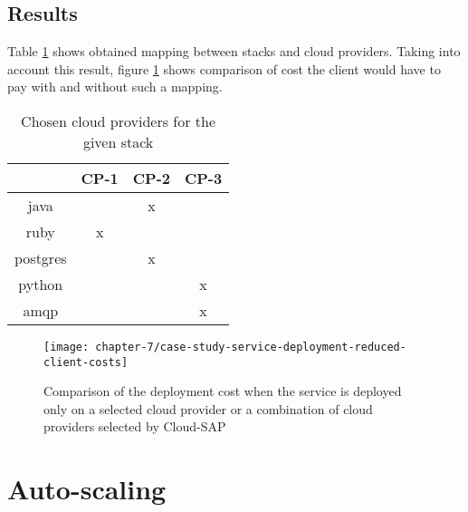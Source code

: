 \subsection{Results}
Table \ref{tbl:test-service-deployment-cost-mapping} shows obtained mapping between stacks and cloud providers. Taking into account this result, figure \ref{ch7:service-deployment-cost} shows comparison of cost the client would have to pay with and without such a mapping.

\begin{table}
  \centering
  \begin{tabular}{ | c | c | c | c | }
    \hline                        
    & CP-1 & CP-2 & CP-3 \\
    \hline
    java      & & x & \\
    ruby      & x & & \\
    postgres  & & x & \\
    python    & & & x \\
    amqp      & & & x \\
    \hline  
  \end{tabular}
  \caption{Chosen cloud providers for the given stack}
  \label{tbl:test-service-deployment-cost-mapping}
\end{table}

\begin{figure}[!ht]
  \begin{center}
    \texttt{[image: chapter-7/case-study-service-deployment-reduced-client-costs]}
  \end{center}
  \caption{Comparison of the deployment cost when the service is deployed only on a selected cloud provider or a combination of cloud providers selected by Cloud-SAP}
  \label{ch7:service-deployment-cost}
\end{figure}

\section{Auto-scaling}
